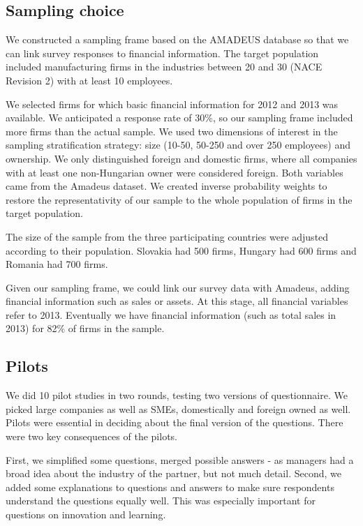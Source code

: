 \documentclass[final, dvipsnames, authoryear,12pt]{elsarticle}
\begin{document}
\subsection{Sampling choice}
We constructed a sampling frame based on the AMADEUS database \cite{amadeus} so that we can link survey responses to financial information. The target population included manufacturing firms in the industries between 20 and 30 (NACE Revision 2) with at least 10 employees.

We selected firms for which basic financial information for 2012 and 2013 was available. We anticipated a response rate of 30\%, so our sampling frame included more firms than the actual sample. We used two dimensions of interest in the sampling stratification strategy: size (10-50, 50-250 and over 250 employees) and ownership. We only distinguished foreign and domestic firms, where all companies with at least one non-Hungarian owner were considered  foreign. Both variables came from the Amadeus dataset. We created inverse probability weights to restore the representativity of our sample to the whole population of firms in the target population.



The size of the sample from the three participating countries were adjusted according to their population. Slovakia had 500 firms, Hungary had 600 firms and Romania had 700 firms.

Given our sampling frame, we could link our survey data with Amadeus, adding financial information such as sales or assets. At this stage, all financial variables refer to 2013. Eventually we have financial information (such as total sales in 2013) for 82\% of firms in the sample. 

\subsection{Pilots}
We did 10 pilot studies in two rounds, testing two versions of questionnaire. We picked large companies as well as SMEs, domestically and foreign owned as well. Pilots were essential in deciding about the final version of the questions. There were two key consequences of the pilots.

First, we simplified some questions, merged possible answers - as managers had a broad idea about the industry of the partner, but not much detail. Second, we added some explanations to questions and answers to make sure respondents understand the questions equally well. This was especially important for questions on innovation and learning. 
\end{document}
